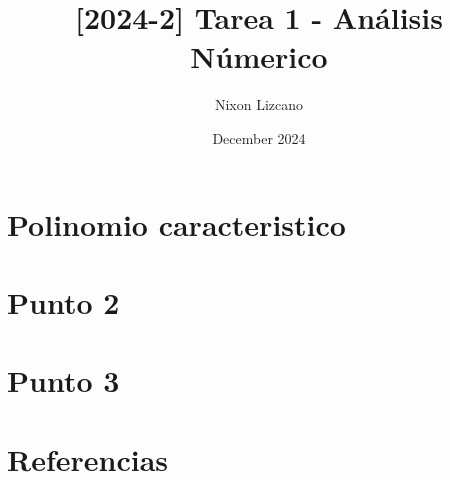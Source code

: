 \documentclass{article}
\title{[2024-2] Tarea 1 - Análisis Númerico}
\author{Nixon Lizcano}
\date{December 2024}
\begin{document}
\maketitle


\section{Polinomio caracteristico}


\section{Punto 2}


\section{Punto 3}



\section{Referencias}
\begingroup
\renewcommand{\section}[2]{}
\begin{thebibliography}{0}
\setlength{\parskip}{0mm}
\setlength{\itemsep}{-0.3mm}
\small


\end{thebibliography}
\endgroup
\end{document}
